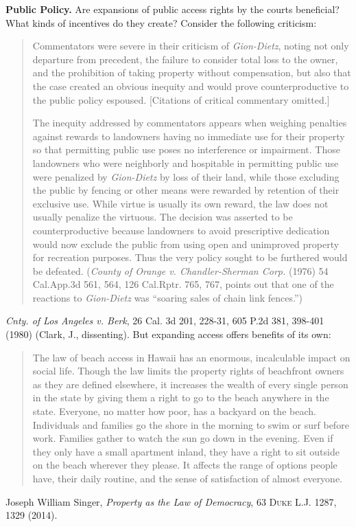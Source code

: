 \item \textbf{Public Policy.} Are expansions of public access rights by the
courts beneficial? What kinds of incentives do they create? Consider the
following criticism:
\begin{quotation}
Commentators were severe in their criticism of \textit{Gion-Dietz}, noting not
only departure from precedent, the failure to consider total loss to the owner,
and the prohibition of taking property without compensation, but also that the
case created an obvious inequity and would prove counterproductive to the public
policy espoused. [Citations of critical commentary omitted.]

The inequity addressed by commentators appears when weighing penalties against
rewards to landowners having no immediate use for their property so that
permitting public use poses no interference or impairment. Those landowners who
were neighborly and hospitable in permitting public use were penalized by
\textit{Gion-Dietz} by loss of their land, while those excluding the public by
fencing or other means were rewarded by retention of their exclusive use. While
virtue is usually its own reward, the law does not usually penalize the
virtuous. The decision was asserted to be counterproductive because landowners
to avoid prescriptive dedication would now exclude the public from using open
and unimproved property for recreation purposes. Thus the very policy sought to
be furthered would be defeated. (\emph{County of Orange v. Chandler-Sherman
Corp.}
(1976) 54 Cal.App.3d 561, 564, 126 Cal.Rptr. 765, 767, points out that one of
the reactions to \emph{Gion-Dietz} was ``soaring sales of chain link fences.'')
\end{quotation}
\emph{Cnty. of Los Angeles v. Berk}, 26 Cal. 3d 201, 228-31, 605 P.2d 381,
398-401 (1980) (Clark, J., dissenting). But expanding access offers benefits of
its own:
\begin{quote}
The law of beach access in Hawaii has an enormous, incalculable impact on social
life. Though the law limits the property rights of beachfront owners as they are
defined elsewhere, it increases the wealth of every single person in the state
by giving them a right to go to the beach anywhere in the state. Everyone, no
matter how poor, has a backyard on the beach. Individuals and families go the
shore in the morning to swim or surf before work. Families gather to watch the
sun go down in the evening. Even if they only have a small apartment inland,
they have a right to sit outside on the beach wherever they please. It affects
the range of options people have, their daily routine, and the sense of
satisfaction of almost everyone.
\end{quote}
Joseph William Singer, \textit{Property as the Law of Democracy}, 63
\textsc{Duke L.J.} 1287, 1329 (2014).

